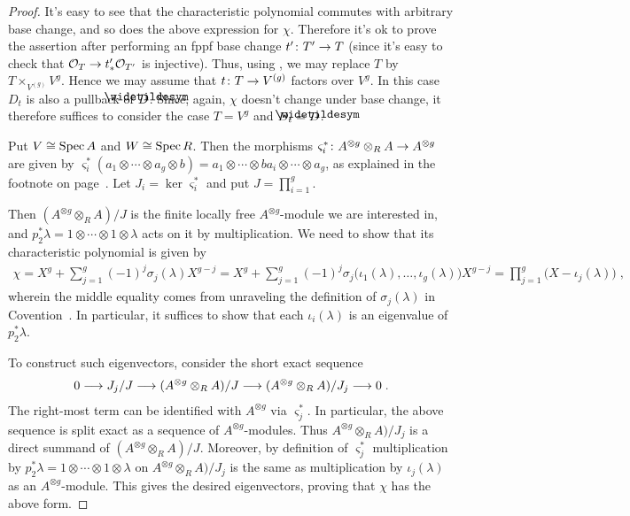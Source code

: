 \documentclass[a4paper,parskip=half,numbers=enddot, DIV=12]{scrreprt}
\begin{document}
\begin{proof}
	It's easy to see that the characteristic polynomial commutes with arbitrary base change, and so does the above expression for $\chi$. Therefore it's ok to prove the assertion after performing an fppf base change  $t'\colon T'\morphism T$ (since it's easy to check that $\Oo_T\morphism t'_*\Oo_{T'}$ is injective). Thus, using , we may replace $T$ by $T\times_{V^{(g)}}V^g$. Hence we may assume that $t\colon T\morphism V^{(g)}$ factors over $V^g$. In this case $D_t$ is also a pullback of $\snake{D}$. Since, again, $\chi$ doesn't change under base change, it therefore suffices to consider the case $T=V^g$ and $D_t=\snake{D}$.
	
	 Put $V\cong \operatorname{Spec} A$ and $W\cong \operatorname{Spec} R$. Then the morphisms $\varsigma_i^*\colon A^{\otimes g}\otimes_RA\morphism A^{\otimes g}$ are given by $\varsigma_i^*(a_1\otimes\cdots\otimes a_g\otimes b)=a_1\otimes\cdots \otimes ba_i\otimes\cdots\otimes a_g$, as explained in the footnote on page~\pageref{footnote:varsigmai}. Let $J_i=\ker\varsigma_i^*$ and put $J=\prod_{i=1}^g$.
	 
	 Then $(A^{\otimes g}\otimes_RA)/J$ is the finite locally free $A^{\otimes g}$-module we are interested in, and $p_2^*\lambda=1\otimes\cdots\otimes 1\otimes \lambda$ acts on it by multiplication. We need to show that its characteristic polynomial is given by
	 \begin{align*}
	 	\chi=X^g+\sum_{j=1}^g(-1)^j\sigma_j(\lambda)X^{g-j}=X^g+\sum_{j=1}^g(-1)^j\sigma_j\big(\iota_1(\lambda),\ldots,\iota_g(\lambda)\big)X^{g-j}=\prod_{j=1}^g\big(X-\iota_j(\lambda)\big)\;,
	 \end{align*}
	 wherein the middle equality comes from unraveling the definition of $\sigma_j(\lambda)$ in Covention~. In particular, it suffices to show that each $\iota_i(\lambda)$ is an eigenvalue of $p_2^*\lambda$.
	 
	 To construct such eigenvectors, consider the short exact sequence
	 \begin{align*}
	 	0\morphism J_j/J\morphism (A^{\otimes g}\otimes_RA)/J\morphism (A^{\otimes g}\otimes_RA)/J_j\morphism 0\;.
	 \end{align*}
	 The right-most term can be identified with $A^{\otimes g}$ via $\varsigma_j^*$. In particular, the above sequence is split exact as a sequence of $A^{\otimes g}$-modules. Thus $A^{\otimes g}\otimes_RA)/J_j$ is a direct summand of $(A^{\otimes g}\otimes_RA)/J$. Moreover, by definition of $\varsigma_j^*$ multiplication by $p_2^*\lambda=1\otimes\cdots\otimes 1\otimes \lambda$ on $A^{\otimes g}\otimes_RA)/J_j$ is the same as multiplication by $\iota_j(\lambda)$ as an $A^{\otimes g}$-module. This gives the desired eigenvectors, proving that $\chi$ has the above form.
	 

\end{proof}
\end{document}
